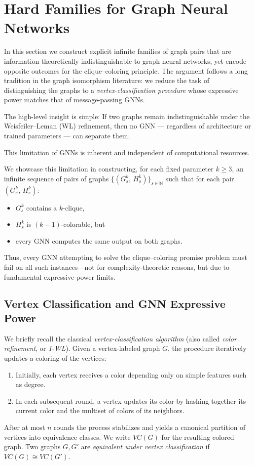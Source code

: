 
\section{Hard Families for Graph Neural Networks}

In this section we construct explicit infinite families of graph pairs that are information-theoretically indistinguishable to graph neural networks, yet encode opposite outcomes for the clique–coloring principle. The argument follows a long tradition in the graph isomorphism literature: we reduce the task of distinguishing the graphs to a \emph{vertex-classification procedure} whose expressive power matches that of message-passing GNNs.

The high-level insight is simple:
If two graphs remain indistinguishable under the Weisfeiler–Leman (WL) refinement, then no GNN --- regardless of architecture or trained parameters --- can separate them.

This limitation of GNNs is inherent and independent of computational resources.

We showcase this limitation in constructing, for each fixed parameter $k \ge 3$, an infinite sequence of pairs of graphs $\{(G_s^k,\, H_s^k)\}_{s \in \mathbb{N}}$
such that for each pair $(G_s^k,\, H_s^k)$:
\begin{itemize}
    \item $G_s^k$ contains a $k$-clique,
    \item $H_s^k$ is $(k-1)$-colorable, but
    \item every GNN computes the same output on both graphs.
\end{itemize}

Thus, every GNN attempting to solve the clique–coloring promise problem must fail on all such instances---not for complexity-theoretic reasons, but due to fundamental expressive-power limits.

\subsection{Vertex Classification and GNN Expressive Power}

We briefly recall the classical \emph{vertex-classification algorithm} (also called \emph{color refinement}, or \emph{1-WL}). Given a vertex-labeled graph $G$, the procedure iteratively updates a coloring of the vertices:
\begin{enumerate}
    \item Initially, each vertex receives a color depending only on simple features such as degree.
    \item In each subsequent round, a vertex updates its color by hashing together its current color and the multiset of colors of its neighbors.
\end{enumerate}
After at most $n$ rounds the process stabilizes and yields a canonical partition of vertices into equivalence classes. We write $VC(G)$ for the resulting colored graph. Two graphs $G,G'$ are \emph{equivalent under vertex classification} if $VC(G) \cong VC(G')$.

